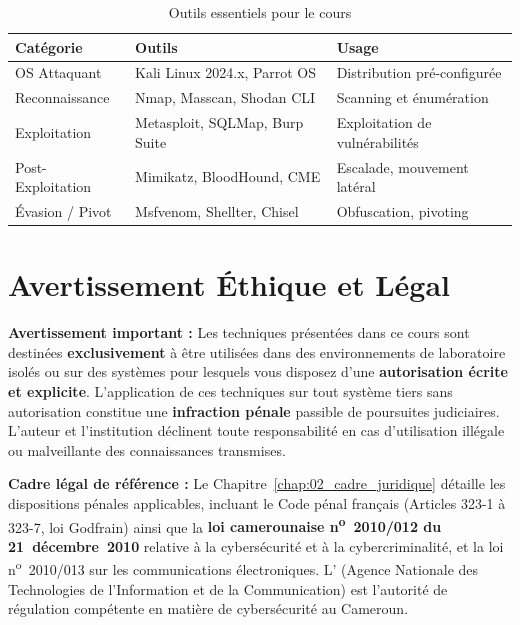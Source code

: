 \begin{table}[htbp]
\centering
\caption{Outils essentiels pour le cours}
\label{tab:outils}
\begin{tabular}{lll}
\toprule
\textbf{Catégorie} & \textbf{Outils} & \textbf{Usage} \\
\midrule
OS Attaquant     & Kali Linux 2024.x, Parrot OS    & Distribution pré-configurée \\
Reconnaissance   & Nmap, Masscan, Shodan CLI        & Scanning et énumération \\
Exploitation     & Metasploit, SQLMap, Burp Suite   & Exploitation de vulnérabilités \\
Post-Exploitation & Mimikatz, BloodHound, CME       & Escalade, mouvement latéral \\
Évasion / Pivot  & Msfvenom, Shellter, Chisel       & Obfuscation, pivoting \\
\bottomrule
\end{tabular}
\end{table}

\section*{Avertissement Éthique et Légal}

\begin{boxalert}
\textbf{Avertissement important :}
Les techniques présentées dans ce cours sont destinées \textbf{exclusivement} à
être utilisées dans des environnements de laboratoire isolés ou sur des systèmes
pour lesquels vous disposez d'une \textbf{autorisation écrite et explicite}.
L'application de ces techniques sur tout système tiers sans autorisation constitue
une \textbf{infraction pénale} passible de poursuites judiciaires. L'auteur et
l'institution déclinent toute responsabilité en cas d'utilisation illégale ou
malveillante des connaissances transmises.

\smallskip
\noindent\textbf{Cadre légal de référence :} Le Chapitre~\ref{chap:02_cadre_juridique}
détaille les dispositions pénales applicables, incluant le Code pénal français
(Articles 323-1 à 323-7, loi Godfrain) ainsi que la \textbf{loi camerounaise
n\textsuperscript{o}~2010/012 du 21~décembre~2010} relative à la cybersécurité
et à la cybercriminalité, et la loi n\textsuperscript{o}~2010/013 sur les
communications électroniques. L' (Agence Nationale des Technologies
de l'Information et de la Communication) est l'autorité de régulation compétente
en matière de cybersécurité au Cameroun.
\end{boxalert}


